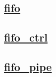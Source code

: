 \documentclass{article}
\begin{document}
  


  \subsection{\href{../files/fifo-v.html}{fifo}}

  \subsection{\href{../files/fifo_ctrl-v.html}{fifo\_ctrl}}

  \subsection{\href{../files/fifo_pipe-v.html}{fifo\_pipe}}
\end{document}
